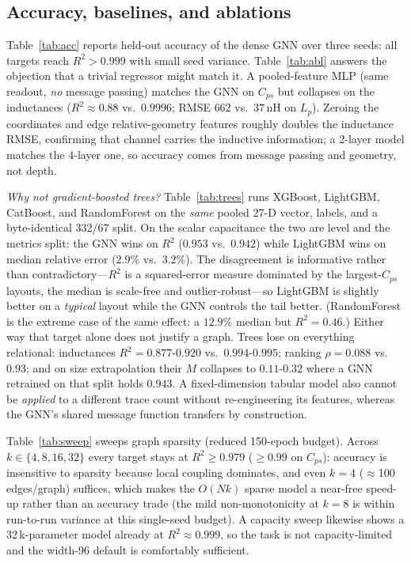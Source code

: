\documentclass[letterpaper,twocolumn,9pt]{extarticle}
\begin{document}
\subsection{Accuracy, baselines, and ablations}
Table~\ref{tab:acc} reports held-out accuracy of the dense GNN over three seeds:
all targets reach $R^2>0.999$ with small seed variance. Table~\ref{tab:abl}
answers the objection that a trivial regressor might match it. A pooled-feature
MLP (same readout, \emph{no} message passing) matches the GNN on $C_{ps}$ but
collapses on the inductances ($R^2\!\approx\!0.88$ vs.\ $0.9996$; RMSE $662$ vs.\
$37$\,nH on $L_p$). Zeroing the coordinates and edge relative-geometry features
roughly doubles the inductance RMSE, confirming that channel carries the inductive
information; a 2-layer model matches the 4-layer one, so accuracy comes from
message passing and geometry, not depth.

\emph{Why not gradient-boosted trees?} Table~\ref{tab:trees} runs XGBoost,
LightGBM, CatBoost, and RandomForest on the \emph{same} pooled 27-D vector,
labels, and a byte-identical 332/67 split. On the scalar capacitance the two are
level and the metrics split: the GNN wins on $R^2$ ($0.953$ vs.\ $0.942$) while
LightGBM wins on median relative error ($2.9\%$ vs.\ $3.2\%$). The disagreement is
informative rather than contradictory---$R^2$ is a squared-error measure dominated
by the largest-$C_{ps}$ layouts, the median is scale-free and outlier-robust---so
LightGBM is slightly better on a \emph{typical} layout while the GNN controls the
tail better. (RandomForest is the extreme case of the same effect: a $12.9\%$
median but $R^2=0.46$.) Either way that target alone does not justify a graph.
Trees lose on
everything relational: inductances $R^2=0.877$-$0.920$ vs.\ $0.994$-$0.995$;
ranking $\rho=0.088$ vs.\ $0.93$; and on size extrapolation their $M$ collapses to
$0.11$-$0.32$ where a GNN retrained on that split holds $0.943$. A fixed-dimension
tabular model also cannot be \emph{applied} to a different trace count without
re-engineering its features, whereas the GNN's shared message function transfers
by construction.

Table~\ref{tab:sweep} sweeps graph sparsity (reduced 150-epoch budget). Across
$k\in\{4,8,16,32\}$ every target stays at $R^2\ge0.979$ ($\ge0.99$ on $C_{ps}$):
accuracy is insensitive to sparsity because local coupling dominates, and even
$k=4$ ($\approx$100 edges/graph) suffices, which makes the $O(Nk)$ sparse model a
near-free speed-up rather than an accuracy trade (the mild non-monotonicity at
$k=8$ is within run-to-run variance at this single-seed budget). A capacity sweep
likewise shows a 32\,k-parameter model already at $R^2\approx0.999$, so the task
is not capacity-limited and the width-96 default is comfortably sufficient.
\end{document}

